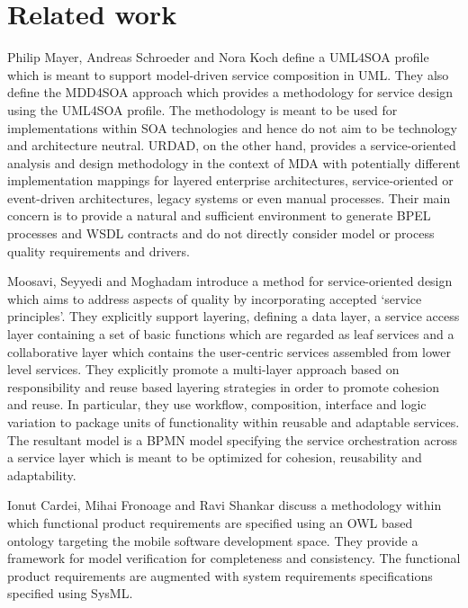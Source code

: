 \section{Related work}
\label{sec:relatedWork}

Philip Mayer, Andreas Schroeder and Nora Koch\cite{mayer_mdd4soa:_2008} define a UML4SOA profile which is meant to support model-driven service composition in UML. They also define the MDD4SOA approach which provides a methodology for service design using the UML4SOA profile. The methodology is meant to be used for implementations within SOA technologies and hence do not aim to be technology and architecture neutral. URDAD, on the other hand, provides a service-oriented analysis and design methodology in the context of MDA with potentially different implementation mappings for layered enterprise architectures, service-oriented or event-driven architectures, legacy systems or even manual processes. Their main concern is to provide a natural and sufficient environment to generate BPEL processes and WSDL contracts and do not directly consider model or process quality requirements and drivers.

Moosavi, Seyyedi and Moghadam\cite{moosavi_method_2009} introduce a method for service-oriented design which aims to address aspects of quality by incorporating accepted `service principles'. They explicitly support layering, defining a data layer, a service access layer containing a set of basic functions which are regarded as leaf services and a collaborative layer which contains the user-centric services assembled from lower level services. They explicitly promote a multi-layer approach based on responsibility and reuse based layering strategies in order to promote cohesion and reuse. In particular, they use workflow, composition, interface and logic variation to package units of functionality within reusable and adaptable services. The resultant model is a BPMN model specifying the service orchestration across a service layer which is meant to be optimized for cohesion, reusability and adaptability.

Ionut Cardei, Mihai Fronoage and Ravi Shankar\cite{cardei_model_2008} discuss a methodology within which functional product requirements are specified using an OWL based ontology targeting the mobile software development space. They provide a framework for model verification for completeness and consistency. The functional product requirements are augmented with system requirements specifications specified using SysML.